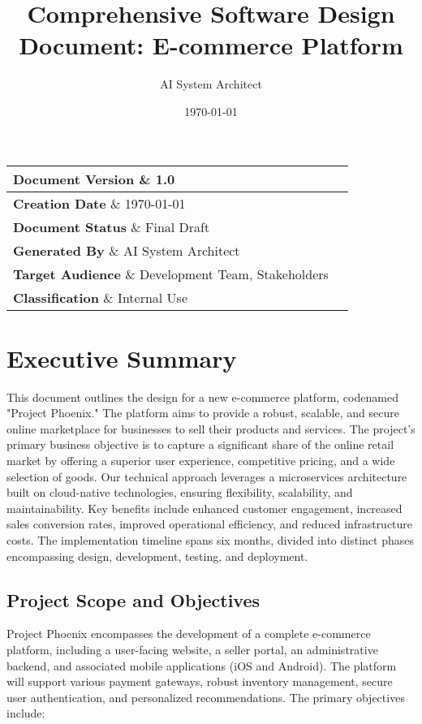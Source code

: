 \documentclass[11pt,a4paper,oneside]{article}
\title{\Huge\textbf{Comprehensive Software Design Document: E-commerce Platform}}
\author{\Large AI System Architect}
\date{\Large\today}
\begin{document}
\maketitle
\thispagestyle{empty}
\vfill

\begin{center}
\large
\begin{tabular}{|l|l|}
\hline
\textbf{Document Version} \& 1.0 \\
\hline
\textbf{Creation Date} \& \today \\
\hline
\textbf{Document Status} \& Final Draft \\
\hline
\textbf{Generated By} \& AI System Architect \\
\hline
\textbf{Target Audience} \& Development Team, Stakeholders \\
\hline
\textbf{Classification} \& Internal Use \\
\hline
\end{tabular}
\end{center}

\newpage
\tableofcontents
\newpage
\listoffigures
\newpage

\section{Executive Summary}

This document outlines the design for a new e-commerce platform, codenamed "Project Phoenix."  The platform aims to provide a robust, scalable, and secure online marketplace for businesses to sell their products and services.  The project's primary business objective is to capture a significant share of the online retail market by offering a superior user experience, competitive pricing, and a wide selection of goods.  Our technical approach leverages a microservices architecture built on cloud-native technologies, ensuring flexibility, scalability, and maintainability. Key benefits include enhanced customer engagement, increased sales conversion rates, improved operational efficiency, and reduced infrastructure costs. The implementation timeline spans six months, divided into distinct phases encompassing design, development, testing, and deployment.

\subsection{Project Scope and Objectives}

Project Phoenix encompasses the development of a complete e-commerce platform, including a user-facing website, a seller portal, an administrative backend, and associated mobile applications (iOS and Android).  The platform will support various payment gateways, robust inventory management, secure user authentication, and personalized recommendations.  The primary objectives include:
\end{document}
